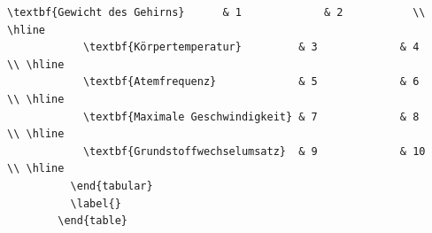 \begin{frame}[fragile]
\begin{lstlisting}[gobble=8]
            \textbf{Gewicht des Gehirns}      & 1             & 2           \\ \hline 
            \textbf{Körpertemperatur}         & 3             & 4           \\ \hline 
            \textbf{Atemfrequenz}             & 5             & 6           \\ \hline 
            \textbf{Maximale Geschwindigkeit} & 7             & 8           \\ \hline 
            \textbf{Grundstoffwechselumsatz}  & 9             & 10          \\ \hline
          \end{tabular} 
          \label{}
        \end{table}
	\end{lstlisting}
\end{frame}
